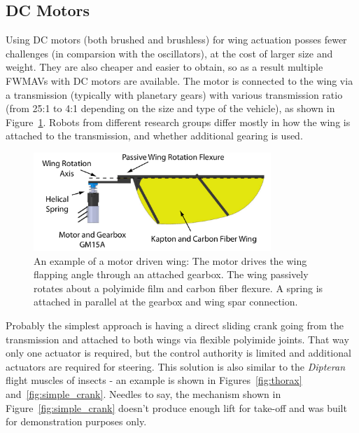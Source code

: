 \subsection{DC Motors}
\label{subsec:dc_motors}
Using DC motors (both brushed and brushless) for wing actuation posses fewer challenges (in comparsion with the oscillators), at the cost of larger size and weight. They are also cheaper and easier to obtain, so as a result multiple FWMAVs with DC motors are available. The motor is connected to the wing via a transmission (typically with planetary gears) with various transmission ratio (from 25:1 to 4:1 depending on the size and type of the vehicle), as shown in Figure~\ref{fig:motor_and_wing}. Robots from different research groups differ mostly in how the wing is attached to the transmission, and whether additional gearing is used.

\begin{figure}
\centering
\includegraphics[width=0.8\textwidth]{Files/Figures/motor_and_wing.png}
\caption[DC motor and wing assembly]{An example of a motor driven wing: The motor drives the wing flapping angle through an attached gearbox. The wing passively rotates about a polyimide film and carbon fiber flexure. A spring is attached in parallel at the gearbox and wing spar connection. \cite{Hines2015}}
\label{fig:motor_and_wing}
\end{figure}

Probably the simplest approach is having a direct sliding crank going from the transmission and attached to both wings via flexible polyimide joints. That way only one actuator is required, but the control authority is limited and additional actuators are required for steering. This solution is also similar to the \textit{Dipteran} flight muscles of insects - an example is shown in Figures~\ref{fig:thorax} and~\ref{fig:simple_crank}. Needles to say, the mechanism shown in Figure~\ref{fig:simple_crank} doesn't produce enough lift for take-off and was built for demonstration purposes only.

